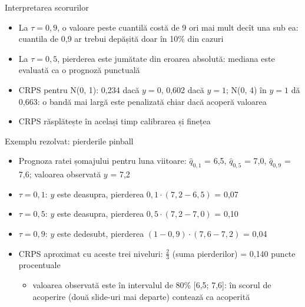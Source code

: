 \begin{frame}{Interpretarea scorurilor}
\itemsize{\small}
\begin{itemize}
    \item La $\tau = 0{,}9$, o valoare peste cuantilă costă de 9 ori mai mult decît una sub ea: cuantila de 0,9 ar trebui depășită doar în 10\% din cazuri
    \item La $\tau = 0{,}5$, pierderea este jumătate din eroarea absolută: mediana este evaluată ca o prognoză punctuală
    \item CRPS pentru N(0, 1): 0{,}234 dacă $y = 0$, 0{,}602 dacă $y = 1$; N(0, 4) în $y = 1$ dă 0{,}663: o bandă mai largă este penalizată chiar dacă acoperă valoarea
    \item CRPS răsplătește în același timp calibrarea și finețea
\end{itemize}
\end{frame}

\begin{frame}{Exemplu rezolvat: pierderile pinball}
\itemsize{\small}
\begin{itemize}
    \item Prognoza ratei șomajului pentru luna viitoare: $\hat q_{0{,}1}$ = 6{,}5, $\hat q_{0{,}5}$ = 7{,}0, $\hat q_{0{,}9}$ = 7{,}6; valoarea observată $y$ = 7{,}2
    \item $\tau = 0{,}1$: $y$ este deasupra, pierderea $0{,}1 \cdot (7{,}2 - 6{,}5)$ = 0{,}07
    \item $\tau = 0{,}5$: $y$ este deasupra, pierderea $0{,}5 \cdot (7{,}2 - 7{,}0)$ = 0{,}10
    \item $\tau = 0{,}9$: $y$ este dedesubt, pierderea $(1 - 0{,}9) \cdot (7{,}6 - 7{,}2)$ = 0{,}04
    \item CRPS aproximat cu aceste trei niveluri: $\frac{2}{3}$ (suma pierderilor) = 0{,}140 puncte procentuale
    \begin{itemize}
        \item valoarea observată este în intervalul de 80\% [6,5; 7,6]: în scorul de acoperire (două slide-uri mai departe) contează ca acoperită
    \end{itemize}
\end{itemize}
\end{frame}

